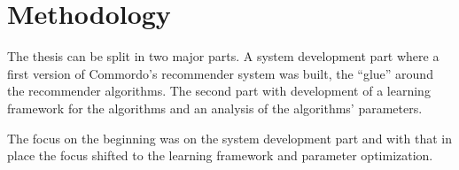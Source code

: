 \chapter{Methodology}\label{cha:method}


The thesis can be split in two major parts. A system development part where a first version of Commordo's recommender system was built, the ``glue'' around the recommender algorithms. The second part with development of a learning framework for the algorithms and an analysis of the algorithms' parameters.

The focus on the beginning was on the system development part and with that in place the focus shifted to the learning framework and parameter optimization.





